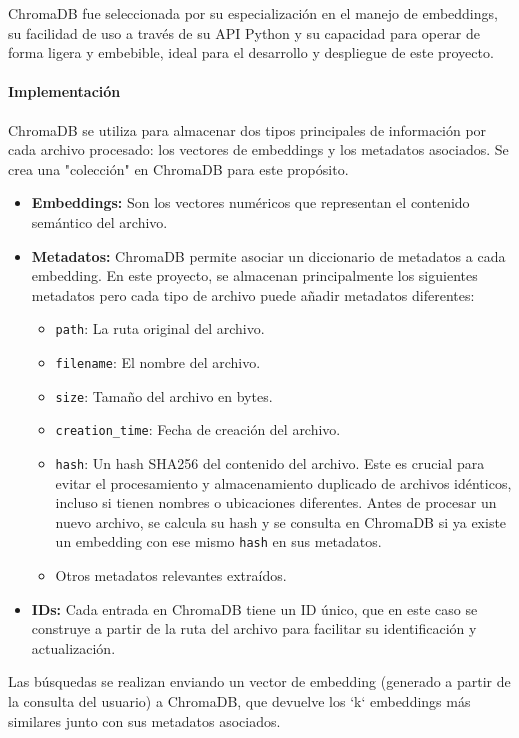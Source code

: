ChromaDB fue seleccionada por su especialización en el manejo de embeddings, su facilidad de uso a través de su API Python y su capacidad para operar de forma ligera y embebible, ideal para el desarrollo y despliegue de este proyecto.

\paragraph{Implementación}
ChromaDB se utiliza para almacenar dos tipos principales de información por cada archivo procesado: los vectores de embeddings y los metadatos asociados. Se crea una "colección" en ChromaDB para este propósito.
\begin{itemize}
    \item \textbf{Embeddings:} Son los vectores numéricos que representan el contenido semántico del archivo.
    \item \textbf{Metadatos:} ChromaDB permite asociar un diccionario de metadatos a cada embedding. En este proyecto, se almacenan principalmente los siguientes metadatos pero cada tipo de archivo puede añadir metadatos diferentes:
        \begin{itemize}
            \item \texttt{path}: La ruta original del archivo.
            \item \texttt{filename}: El nombre del archivo.
            \item \texttt{size}: Tamaño del archivo en bytes.
            \item \texttt{creation\_time}: Fecha de creación del archivo.
            \item \texttt{hash}: Un hash SHA256 del contenido del archivo. Este es crucial para evitar el procesamiento y almacenamiento duplicado de archivos idénticos, incluso si tienen nombres o ubicaciones diferentes. Antes de procesar un nuevo archivo, se calcula su hash y se consulta en ChromaDB si ya existe un embedding con ese mismo \texttt{hash} en sus metadatos.
            \item Otros metadatos relevantes extraídos.
        \end{itemize}
    \item \textbf{IDs:} Cada entrada en ChromaDB tiene un ID único, que en este caso se construye a partir de la ruta del archivo para facilitar su identificación y actualización.
\end{itemize}
Las búsquedas se realizan enviando un vector de embedding (generado a partir de la consulta del usuario) a ChromaDB, que devuelve los `k` embeddings más similares junto con sus metadatos asociados.

